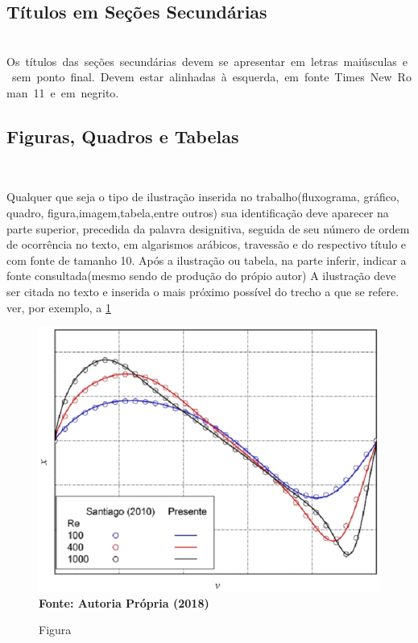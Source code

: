 \documentclass{modelo}
\begin{document}
 \subsection{Títulos em Seções Secundárias} 
 Os títulos das seções secundárias devem se apresentar em letras maiúsculas e sem ponto final. Devem estar alinhadas à esquerda, em fonte Times New Roman 11 e em negrito. 
  

  
\subsection{Figuras, Quadros e Tabelas}  

Qualquer que seja o tipo de ilustração inserida no trabalho(fluxograma, gráfico, quadro, figura,imagem,tabela,entre outros) sua identificação deve aparecer na parte superior, precedida da palavra designitiva, seguida de seu número de ordem de ocorrência no texto, em algarismos arábicos, travessão e do respectivo título e com fonte de tamanho 10. Após a ilustração ou tabela, na parte inferir, indicar a fonte consultada(mesmo sendo de produção do própio autor)
A ilustração deve ser citada no texto e inserida o mais próximo possível do trecho a que se refere. ver, por exemplo, a \ref{fig:figura1}


\begin{figure}[H] 
\begin{center} 
\label{fig:figura1}  
\caption{Figura}
\includegraphics[scale=0.5]{figs/fig1} \\
\textbf{Fonte: Autoria Própria (2018)}
\end{center}
\end{figure}
\end{document}
